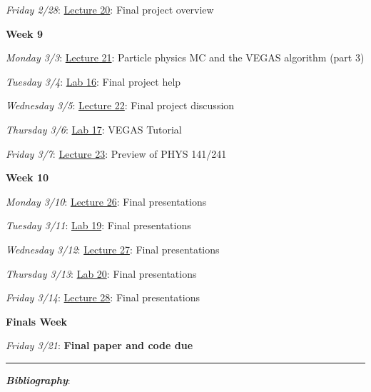 \documentclass[12pt]{article}
\begin{document}
\emph{Friday 2/28}: \underline{Lecture 20}: Final project overview

\noindent\textbf{Week 9}

\emph{Monday 3/3}: \underline{Lecture 21}: Particle physics MC and the VEGAS algorithm (part 3)

\emph{Tuesday 3/4}: \underline{Lab 16}: Final project help

\emph{Wednesday 3/5}: \underline{Lecture 22}: Final project discussion

\emph{Thursday 3/6}: \underline{Lab 17}: VEGAS Tutorial

\emph{Friday 3/7}: \underline{Lecture 23}: Preview of PHYS 141/241

\noindent\textbf{Week 10}

\emph{Monday 3/10}: \underline{Lecture 26}: Final presentations

\emph{Tuesday 3/11}: \underline{Lab 19}: Final presentations

\emph{Wednesday 3/12}: \underline{Lecture 27}: Final presentations

\emph{Thursday 3/13}: \underline{Lab 20}: Final presentations

\emph{Friday 3/14}: \underline{Lecture 28}: Final presentations

\noindent\textbf{Finals Week}

\emph{Friday 3/21}: \textbf{Final paper and code due}

\begin{center}
  \rule{\textwidth}{0.5pt}
\end{center}
\nocite{*}

\noindent\textbf{\emph{Bibliography}}:\\
\printbibliography[heading=none]
\end{document}

